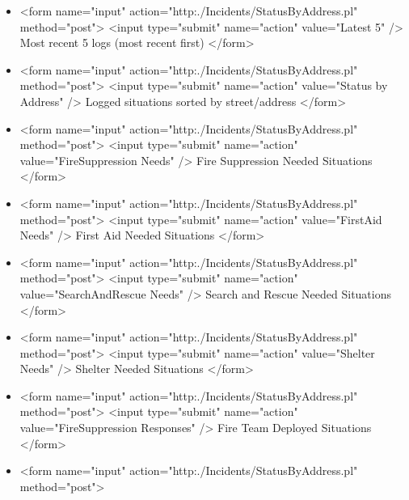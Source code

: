 \begin{itemize}
\item
\begin{rawhtml}
<form name="input" 
action="http:./Incidents/StatusByAddress.pl" method="post"> 
 <input type="submit" name="action" value="Latest 5" />
 Most recent 5 logs (most recent first) 
</form>
\end{rawhtml}
\item
\begin{rawhtml}
<form name="input" 
action="http:./Incidents/StatusByAddress.pl" method="post"> 
 <input type="submit" name="action" value="Status by Address" />
 Logged situations sorted by street/address 
</form>
\end{rawhtml}
\item
\begin{rawhtml}
<form name="input" 
action="http:./Incidents/StatusByAddress.pl" method="post"> 
 <input type="submit" name="action" value="FireSuppression Needs" />
 Fire Suppression Needed Situations 
</form>
\end{rawhtml}
\item
\begin{rawhtml}
<form name="input" 
action="http:./Incidents/StatusByAddress.pl" method="post"> 
 <input type="submit" name="action" value="FirstAid Needs" />
 First Aid Needed Situations 
</form>
\end{rawhtml}
\item
\begin{rawhtml}
<form name="input" 
action="http:./Incidents/StatusByAddress.pl" method="post"> 
 <input type="submit" name="action" value="SearchAndRescue Needs" />
 Search and Rescue Needed Situations 
</form>
\end{rawhtml}
\item
\begin{rawhtml}
<form name="input" 
action="http:./Incidents/StatusByAddress.pl" method="post"> 
 <input type="submit" name="action" value="Shelter Needs" />
 Shelter Needed Situations 
</form>
\end{rawhtml}
\item
\begin{rawhtml}
<form name="input" 
action="http:./Incidents/StatusByAddress.pl" method="post"> 
 <input type="submit" name="action" value="FireSuppression Responses" />
 Fire Team Deployed Situations 
</form>
\end{rawhtml}
\item
\begin{rawhtml}
<form name="input" 
action="http:./Incidents/StatusByAddress.pl" method="post"> 

\end{rawhtml}
\end{itemize}
